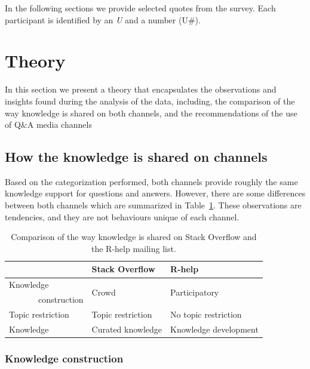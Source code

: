 \documentclass{sig-alternate-05-2015}
\begin{document}
In the following sections we provide selected quotes from the survey.
Each participant is identified by an \emph{U} and a number (U\#).


\section{Theory}
\label{cha:theory}

	In this section we present a theory that encapsulates the observations and insights found during the analysis of the data, including, the comparison of the way knowledge is shared on both channels, and the recommendations of the use of Q\&A media channels

\subsection{How the knowledge is shared on channels}

	Based on the categorization performed, both channels provide roughly the same knowledge support for questions and answers.
	However, there are some differences between both channels which are summarized in Table~\ref{table:constrat}.
	These observations are tendencies, and they are not behaviours unique of each channel.

    \begin{table}[!htb]
      \centering
	  \caption{Comparison of the way knowledge is shared on Stack Overflow and the R-help mailing list.}
	  \label{table:constrat}
	  \begin{tabular}{@{}lll@{}}
        \toprule
        \textbf{}     & \textbf{Stack Overflow} & \textbf{R-help}\\
        \midrule
        Knowledge              & \multirow{2}{*}{Crowd} & \multirow{2}{*}{Participatory} \\
        ~~~~~~~construction    &                   &  \\
        Topic restriction      & Topic restriction & No topic restriction \\
        Knowledge              & Curated knowledge & Knowledge development\\
        \bottomrule
	  \end{tabular}
	\end{table}


	\subsubsection{Knowledge construction}
\end{document}
